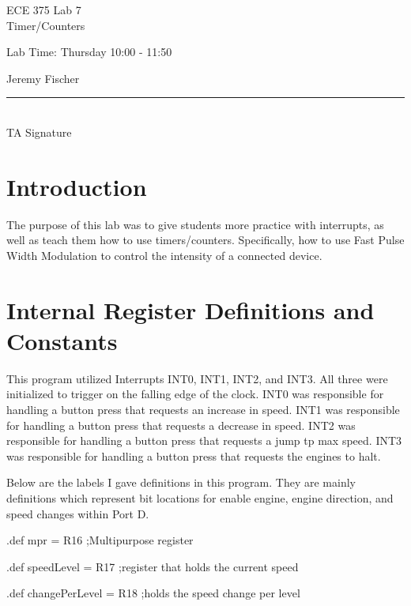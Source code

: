 \documentclass[12pt,letterpaper]{article}
\begin{document}
\begin{titlepage}
    \vspace*{4cm}
    \begin{flushright}
    {\huge
        ECE 375 Lab 7\\[1cm]
    }
    {\large
        Timer/Counters
    }
    \end{flushright}
    \begin{flushleft}
    Lab Time: Thursday  10:00 - 11:50
    \end{flushleft}
    \begin{flushright}
    Jeremy Fischer

    \vfill
    \rule{5in}{.5mm}\\
    TA Signature
    \end{flushright}

\end{titlepage}

\section{Introduction}
	The purpose of this lab was to give students more practice with interrupts, as well as teach them how to use timers/counters.
	Specifically, how to use Fast Pulse Width Modulation to control the intensity of a connected device.

\section{Internal Register Definitions and Constants}
	This program utilized Interrupts INT0, INT1, INT2, and INT3.
	All three were initialized to trigger on the falling edge of the clock.
	INT0 was responsible for handling a button press that requests an increase in speed.
	INT1 was responsible for handling a button press that requests a decrease in speed.
	INT2 was responsible for handling a button press that requests a jump tp max speed.
	INT3 was responsible for handling a button press that requests the engines to halt.
	
	
	Below are the labels I gave definitions in this program.
	They are mainly definitions which represent bit locations for enable engine, engine direction, and speed changes within Port D.

	.def	mpr = R16			\hfill	;Multipurpose register
	
	.def	speedLevel = R17	\hfill	;register that holds the current speed
	
	.def	changePerLevel = R18	\hfill;holds the speed change per level
	
\end{document}
